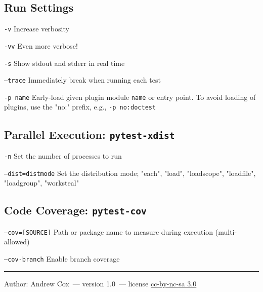 \documentclass[10pt,landscape,a4paper]{article}
\newcommand{\theauthor}{Andrew Cox}
\newcommand{\theversion}{1.0}
\begin{document}
\begin{multicols}{2}
\subsection{Run Settings}
\begin{eqlist}
	\item[\texttt{-v}] Increase verbosity
	\item[\texttt{-vv}] Even more verbose!
	\item[\texttt{-s}] Show stdout and stderr in real time
	\item[\texttt{--trace}] Immediately break when running each test
	\item[\texttt{-p name}] Early-load given plugin module \texttt{name} or entry point. To avoid loading of plugins, use the "no:" prefix, e.g., \texttt{-p no:doctest}
\end{eqlist}

\subsection{Parallel Execution: \texttt{pytest-xdist}}

\begin{eqlist}
	\item[\texttt{-n}] Set the number of processes to run
	\item[\texttt{--dist=distmode}] Set the distribution mode; "each", "load", "loadscope", "loadfile", "loadgroup", "worksteal"
\end{eqlist}
					
\subsection{Code Coverage: \texttt{pytest-cov}}

\begin{eqlist}
	\item[\texttt{--cov=[SOURCE]}] Path or package name to measure during execution (multi-allowed)
	\item[\texttt{--cov-branch}] Enable branch coverage
\end{eqlist}

\small{%
\hrule
Author: \theauthor~--- version \theversion~--- license \href{https://creativecommons.org/licenses/by-nc-sa/3.0}{cc-by-nc-sa 3.0}\\
}

\end{multicols}
\end{document}
